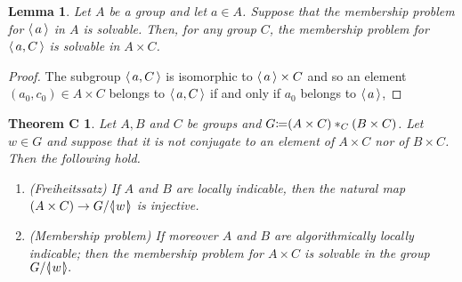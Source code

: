 \documentclass[12pt, a4paper]{amsart}
\newtheorem*{ThmC}{Theorem C}
\newtheorem{Lem}[Thm]{Lemma}
\theoremstyle{remark}
\theoremstyle{definition}
\begin{document}
\begin{Lem}\label{lem:memberZ}
Let $A$ be a group and let $a\in A$. Suppose that the membership problem for ${\langle\mkern3mu{a}\mkern3mu\rangle}$ in $A$ is solvable. Then, for any group $C$, the membership problem for ${\langle\mkern3mu{a, C}\mkern3mu\rangle}$ is solvable in $A\times C$.
\end{Lem}\begin{proof}
The subgroup ${\langle\mkern3mu{a,C}\mkern3mu\rangle}$ is isomorphic to ${\langle\mkern3mu{a}\mkern3mu\rangle}\times C$ and so an element $(a_0,c_0)\in A\times C$ belongs to ${\langle\mkern3mu{a,C}\mkern3mu\rangle}$ if and only if $a_0$ belongs to ${\langle\mkern3mu{a}\mkern3mu\rangle}$, 
\end{proof}

\begin{ThmC}
Let $A, B$ and $C$ be  groups and  $G{\mathrel{\mathop\mathchar"303A}\mkern-1.2mu=} (A\times C)*_C(B\times C)$. Let $w\in G$ and suppose that it is not conjugate to an element of $A\times C$ nor of $B\times C$. 
Then the following hold.
\begin{enumerate}
\item[{\rm(i)}](Freiheitssatz) If $A$ and $B$ are locally indicable, then the natural map $(A\times C)\to G/{{\langle}{\mkern-3.7mu}{\lvert}{\mkern1.2mu}{{w}}{\mkern1.2mu}{\rvert}{\mkern-3.7mu}{\rangle}}$ is injective.
\item[{\rm(ii)}](Membership problem) If moreover  $A$ and $B$ are algorithmically locally indicable;
then the membership problem for $A\times C$ is solvable in the group $G/{{\langle}{\mkern-3.7mu}{\lvert}{\mkern1.2mu}{{w}}{\mkern1.2mu}{\rvert}{\mkern-3.7mu}{\rangle}}.$ 
\end{enumerate}
\end{ThmC}
\end{document}
